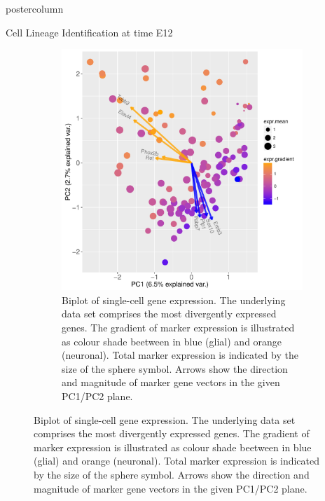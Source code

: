 \documentclass{beamer}
\begin{document}
\begin{frame}
\begin{columns}
\begin{column}{.45\textwidth}
\begin{beamercolorbox}[center]{postercolumn}
\begin{minipage}{.98\textwidth}
{\begin{myblock}{Cell Lineage Identification at time E12}
\begin{figure}
\begin{figure}
\begin{minipage}{0.45\textwidth}
	\centering\includegraphics[width=1.0\textwidth]{./biplot_semisuperv}
	\caption{Biplot of single-cell gene expression. The underlying data set
		comprises the most divergently expressed genes. The gradient of marker
		expression is illustrated as colour shade beetween in blue (glial) and
		orange (neuronal).
		Total marker expression is indicated by the size of the sphere symbol.
		Arrows show the direction and magnitude of marker gene vectors
		in the given PC1/PC2 plane.}
	\label{fig:biplot}
\end{minipage}


\end{figure}
\end{figure}
\end{myblock}}
\end{minipage}
\end{beamercolorbox}
\end{column}
\end{columns}
\end{frame}
\end{document}
